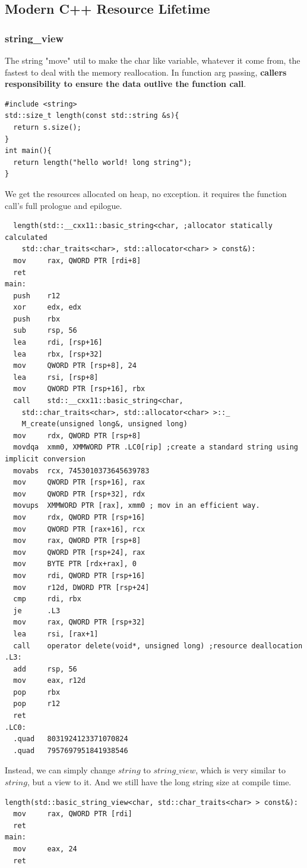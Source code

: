 \documentclass[a4paper]{exam}
\theoremstyle{definition}
\begin{document}
\subsection{Modern C++ Resource Lifetime}
\subsubsection{string\_view}
The string "move" util to make the char like variable, whatever it come from, the fastest to deal with the memory reallocation. In function arg passing, \textbf{callers responsibility to ensure the data outlive the function call\cite{stringview}}.

\begin{verbatim}
#include <string>
std::size_t length(const std::string &s){
  return s.size();
}
int main(){
  return length("hello world! long string");
}
\end{verbatim}

We get the resources allocated on heap, no exception. it requires the function call's full prologue and epilogue.
\begin{verbatim}
  length(std::__cxx11::basic_string<char, ;allocator statically calculated
    std::char_traits<char>, std::allocator<char> > const&):
  mov     rax, QWORD PTR [rdi+8]
  ret
main:
  push    r12
  xor     edx, edx
  push    rbx
  sub     rsp, 56
  lea     rdi, [rsp+16]
  lea     rbx, [rsp+32]
  mov     QWORD PTR [rsp+8], 24
  lea     rsi, [rsp+8]
  mov     QWORD PTR [rsp+16], rbx
  call    std::__cxx11::basic_string<char, 
    std::char_traits<char>, std::allocator<char> >::_
    M_create(unsigned long&, unsigned long)
  mov     rdx, QWORD PTR [rsp+8]
  movdqa  xmm0, XMMWORD PTR .LC0[rip] ;create a standard string using implicit conversion
  movabs  rcx, 7453010373645639783
  mov     QWORD PTR [rsp+16], rax
  mov     QWORD PTR [rsp+32], rdx
  movups  XMMWORD PTR [rax], xmm0 ; mov in an efficient way.
  mov     rdx, QWORD PTR [rsp+16]
  mov     QWORD PTR [rax+16], rcx
  mov     rax, QWORD PTR [rsp+8]
  mov     QWORD PTR [rsp+24], rax
  mov     BYTE PTR [rdx+rax], 0
  mov     rdi, QWORD PTR [rsp+16]
  mov     r12d, DWORD PTR [rsp+24]
  cmp     rdi, rbx
  je      .L3
  mov     rax, QWORD PTR [rsp+32]
  lea     rsi, [rax+1]
  call    operator delete(void*, unsigned long) ;resource deallocation
.L3:
  add     rsp, 56
  mov     eax, r12d
  pop     rbx
  pop     r12
  ret
.LC0:
  .quad   8031924123371070824
  .quad   7957697951841938546
\end{verbatim}
Instead, we can simply change $string$ to $string\_view$, which is very similar to $string$, but a view to it. And we still have the long string size at compile time.
\begin{verbatim}
length(std::basic_string_view<char, std::char_traits<char> > const&):
  mov     rax, QWORD PTR [rdi]
  ret
main:
  mov     eax, 24
  ret
\end{verbatim}
\end{document}
